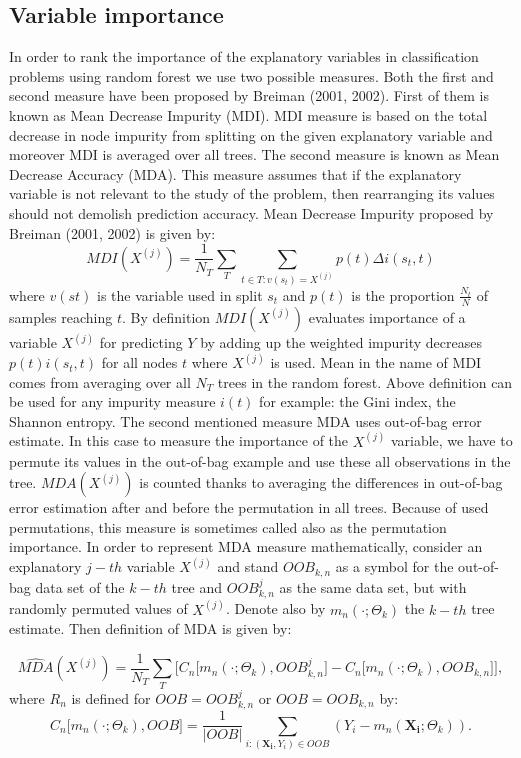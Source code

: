 \subsection{Variable importance}
In order to rank the importance of the explanatory variables in classification problems using random forest we use two possible measures. Both the first and second measure have been proposed by Breiman (2001, 2002). First of them is known as Mean Decrease Impurity (MDI). MDI measure is based on the total decrease in node impurity from splitting on the given explanatory variable and moreover MDI is averaged over all trees. The second measure is known as Mean Decrease Accuracy (MDA). This measure assumes that if the explanatory variable is not relevant to the study of the problem, then rearranging its values should not demolish prediction accuracy. Mean Decrease Impurity proposed by Breiman (2001, 2002) is given by: 
\begin{equation}
\widehat{MDI}( X^{(j)} ) = \frac{1}{N_{T}}\displaystyle\sum_{T}  \displaystyle\sum_{t \in T: v(s_{t}) =  X^{(j)}  } p(t)\Delta i(s_{t}, t)
\end{equation}
where $ v(st) $ is the variable used in split $s_{t}$ and $ p(t) $ is the proportion $\frac{N_{t}}{N}$ of samples reaching $t$.
By definition $ MDI( X^{(j)} ) $ evaluates importance of a variable $ X^{(j)} $ for predicting $Y$ by adding up the weighted impurity decreases $p(t)i(s_{t}, t)$ for all nodes $t$ where $ X^{(j)}$ is used. Mean in the name of MDI comes from averaging over all $N_{T}$ trees in the random forest. Above definition can be used for any impurity measure $i(t)$ for example: the Gini index, the Shannon entropy. The second mentioned measure MDA uses out-of-bag error estimate. In this case to measure the importance of the $X^{(j)}$ variable, we have to permute its values in the out-of-bag example and use these all observations in the tree. $ MDA( X^{(j)})$ is counted thanks to averaging the differences in out-of-bag error estimation after and before the permutation in all trees. Because of used permutations, this measure is sometimes called also as the permutation importance. In order to represent MDA measure mathematically, consider an explanatory $j-th$ variable $X^{(j)}$ and stand $OOB_{k,n}$ as a symbol for the out-of-bag data set of the $k-th$ tree and  $OOB_{k,n}^{j}$ as the same data set, but with randomly permuted values of $X^{(j)}$. Denote also by $ m_{n}(\cdot ;\Theta_{k}) $  the $k-th$ tree estimate. Then definition of MDA is given by:

\begin{equation}
\widehat{MDA}( X^{(j)} ) = \frac{1}{N_{T}}\displaystyle\sum_{T} \Big[C_{n}\big[m_{n}(\cdot ;\Theta_{k}), OOB_{k,n}^{j}\big] - C_{n}\big[m_{n}(\cdot ;\Theta_{k}), OOB_{k,n}\big]   \Big],
\end{equation}
where $R_{n}$ is defined for $ OOB =  OOB_{k,n}^{j}$ or $OOB =  OOB_{k,n}$ by:
\begin{equation}
C_{n}\big[m_{n}(\cdot ;\Theta_{k}), OOB\big] = \frac{1}{|OOB|} \displaystyle\sum_{ i :( \pmb{X_{i}}, Y_{i} )  \in OOB} (Y_{i} - m_{n}( \pmb{X_{i}} ;\Theta_{k})).
\end{equation}

